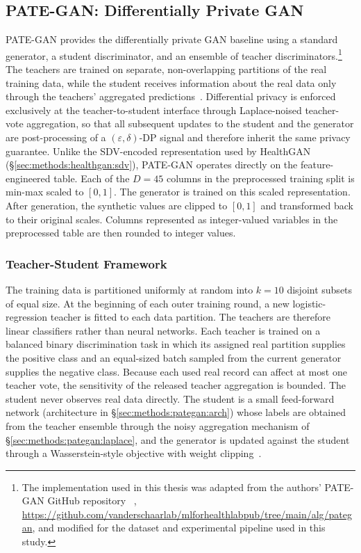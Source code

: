 \subsection{PATE-GAN: Differentially Private GAN}
\label{sec:methods:pategan}


PATE-GAN provides the differentially private GAN baseline using a standard
generator, a student discriminator, and an ensemble of teacher 
discriminators.\footnote{The implementation used in this thesis was adapted
from the authors' PATE-GAN GitHub repository
~\cite{jordon2019pateganCode},
\url{https://github.com/vanderschaarlab/mlforhealthlabpub/tree/main/alg/pategan},
and modified for the dataset and experimental pipeline used in this study.}
The teachers are trained on separate, non-overlapping partitions of the real
training data, while the student receives information about the real data only
through the teachers' aggregated predictions~\cite{pategan,Papernot2017PATE}.
Differential privacy is enforced exclusively at the teacher-to-student
interface through Laplace-noised teacher-vote aggregation, so that all subsequent
updates to the student and the generator are post-processing of a
$(\varepsilon, \delta)$-DP signal and therefore inherit the same privacy
guarantee. Unlike the SDV-encoded representation used by HealthGAN
(\S\ref{sec:methods:healthgan:sdv}), PATE-GAN operates directly on the
feature-engineered table. Each of the $D=45$ columns in the 
preprocessed training split is min-max
scaled to $[0,1]$. The generator is trained on this scaled representation.
After generation, the synthetic values are clipped to $[0,1]$ and transformed
back to their original scales. Columns represented as integer-valued variables
in the preprocessed table are then rounded to integer values.

\subsubsection{Teacher-Student Framework}
\label{sec:methods:pategan:teacher}

The training data is partitioned uniformly at random into $k = 10$ disjoint
subsets of equal size. At the beginning of each outer training round, a new logistic-regression
teacher is fitted to each data partition. The teachers are therefore linear
classifiers rather than neural networks. Each teacher is trained on a balanced binary
discrimination task in which its assigned real partition supplies the
positive class and an equal-sized batch sampled from the current generator
supplies the negative class. Because each used real record can affect at 
most one teacher vote, the
sensitivity of the released teacher aggregation is bounded. The student
never observes real data directly. The student is a small
feed-forward network (architecture in \S\ref{sec:methods:pategan:arch})
whose labels are obtained from the teacher ensemble through the noisy
aggregation mechanism of \S\ref{sec:methods:pategan:laplace}, and the
generator is updated against the student through a Wasserstein-style
objective with weight clipping~\cite{Arjovsky2017WGAN}.

